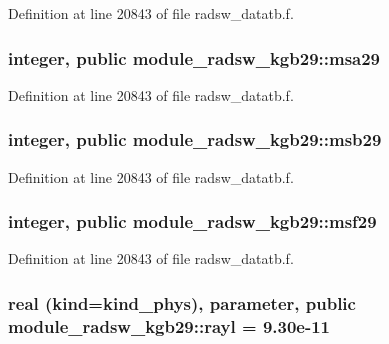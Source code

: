 Definition at line 20843 of file radsw\+\_\+datatb.\+f.

\subsubsection[{\texorpdfstring{msa29}{msa29}}]{\setlength{\rightskip}{0pt plus 5cm}integer, public module\+\_\+radsw\+\_\+kgb29\+::msa29}\hypertarget{namespacemodule__radsw__kgb29_adbee6e5d3b3efc437ff8815e42962b92}{}\label{namespacemodule__radsw__kgb29_adbee6e5d3b3efc437ff8815e42962b92}


Definition at line 20843 of file radsw\+\_\+datatb.\+f.

\subsubsection[{\texorpdfstring{msb29}{msb29}}]{\setlength{\rightskip}{0pt plus 5cm}integer, public module\+\_\+radsw\+\_\+kgb29\+::msb29}\hypertarget{namespacemodule__radsw__kgb29_add8e18a273d5fa133f22fb47c4d722da}{}\label{namespacemodule__radsw__kgb29_add8e18a273d5fa133f22fb47c4d722da}


Definition at line 20843 of file radsw\+\_\+datatb.\+f.

\subsubsection[{\texorpdfstring{msf29}{msf29}}]{\setlength{\rightskip}{0pt plus 5cm}integer, public module\+\_\+radsw\+\_\+kgb29\+::msf29}\hypertarget{namespacemodule__radsw__kgb29_ace849342fcb0d18d825318a2ee26ce0e}{}\label{namespacemodule__radsw__kgb29_ace849342fcb0d18d825318a2ee26ce0e}


Definition at line 20843 of file radsw\+\_\+datatb.\+f.

\subsubsection[{\texorpdfstring{rayl}{rayl}}]{\setlength{\rightskip}{0pt plus 5cm}real (kind=kind\+\_\+phys), parameter, public module\+\_\+radsw\+\_\+kgb29\+::rayl = 9.\+30e-\/11}\hypertarget{namespacemodule__radsw__kgb29_abc0a41a10d73674e124115fe0511cc23}{}\label{namespacemodule__radsw__kgb29_abc0a41a10d73674e124115fe0511cc23}


